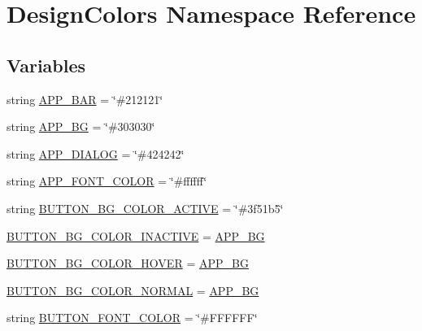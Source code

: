 \hypertarget{namespaceDesignColors}{}\section{Design\+Colors Namespace Reference}
\label{namespaceDesignColors}
\subsection*{Variables}
\begin{DoxyCompactItemize}
\item 
string \hyperlink{namespaceDesignColors_a5b302c557da5bbd6922d98db4e9aeafd}{A\+P\+P\+\_\+\+B\+AR} = \char`\"{}\#212121\char`\"{}
\item 
string \hyperlink{namespaceDesignColors_a78a48ceae30092b74429c7b1fd3511b5}{A\+P\+P\+\_\+\+BG} = \char`\"{}\#303030\char`\"{}
\item 
string \hyperlink{namespaceDesignColors_a84960578bddc2ccc9c8388c264614c35}{A\+P\+P\+\_\+\+D\+I\+A\+L\+OG} = \char`\"{}\#424242\char`\"{}
\item 
string \hyperlink{namespaceDesignColors_a629eeb4081780c12ff7ff7555939150f}{A\+P\+P\+\_\+\+F\+O\+N\+T\+\_\+\+C\+O\+L\+OR} = \char`\"{}\#ffffff\char`\"{}
\item 
string \hyperlink{namespaceDesignColors_a4e1fb0b470b24be659978a50f34dd001}{B\+U\+T\+T\+O\+N\+\_\+\+B\+G\+\_\+\+C\+O\+L\+O\+R\+\_\+\+A\+C\+T\+I\+VE} = \char`\"{}\#3f51b5\char`\"{}
\item 
\hyperlink{namespaceDesignColors_a8ce3dda761694acd71549c0c7275be3e}{B\+U\+T\+T\+O\+N\+\_\+\+B\+G\+\_\+\+C\+O\+L\+O\+R\+\_\+\+I\+N\+A\+C\+T\+I\+VE} = \hyperlink{namespaceDesignColors_a78a48ceae30092b74429c7b1fd3511b5}{A\+P\+P\+\_\+\+BG}
\item 
\hyperlink{namespaceDesignColors_a0e99aab76619ef5e15f72705067d28f2}{B\+U\+T\+T\+O\+N\+\_\+\+B\+G\+\_\+\+C\+O\+L\+O\+R\+\_\+\+H\+O\+V\+ER} = \hyperlink{namespaceDesignColors_a78a48ceae30092b74429c7b1fd3511b5}{A\+P\+P\+\_\+\+BG}
\item 
\hyperlink{namespaceDesignColors_a366ebdc756b424d0740e984b1d022134}{B\+U\+T\+T\+O\+N\+\_\+\+B\+G\+\_\+\+C\+O\+L\+O\+R\+\_\+\+N\+O\+R\+M\+AL} = \hyperlink{namespaceDesignColors_a78a48ceae30092b74429c7b1fd3511b5}{A\+P\+P\+\_\+\+BG}
\item 
string \hyperlink{namespaceDesignColors_af46e3f936c45d87e1caf88d9f264fe6a}{B\+U\+T\+T\+O\+N\+\_\+\+F\+O\+N\+T\+\_\+\+C\+O\+L\+OR} = \char`\"{}\#F\+F\+F\+F\+FF\char`\"{}
\item 

\end{DoxyCompactItemize}
